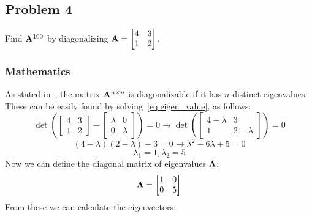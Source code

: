 \subsection{Problem 4}%
\label{sec:problem_4}
Find $\mathbf{A}^{100}$ by diagonalizing $\mathbf{A} = 
\begin{bmatrix}
    4 & 3\\
    1 & 2
\end{bmatrix}$.
\subsubsection*{Mathematics}
As stated in~\cite{Zdunek}, the matrix $\mathbf{A}^{n\times{}n}$ is diagonalizable if it
has $n$ distinct eigenvalues.
These can be easily found by solving~\eqref{eq:eigen_value}, as follows:
\begin{equation*}
    \det{\left(\begin{bmatrix}
        4 & 3 \\
        1 & 2 
    \end{bmatrix} - 
    \begin{bmatrix}
        \lambda & 0 \\
        0 & \lambda
    \end{bmatrix}\right)} = 0 \rightarrow
    \det{\left(\begin{bmatrix}
        4 - \lambda & 3 \\
        1 & 2 - \lambda
    \end{bmatrix}\right)} = 0
\end{equation*}
\begin{equation*}
    (4 - \lambda)(2 - \lambda) - 3 = 0 \rightarrow
    \lambda^2 - 6\lambda + 5 = 0
\end{equation*}
\begin{equation*}
    \lambda_1 = 1, \lambda_2 = 5 
\end{equation*}
Now we can define the diagonal matrix of eigenvalues $\mathbf{\Lambda}$:
\begin{equation*}
    \mathbf{\Lambda} = 
    \begin{bmatrix}
        1 & 0 \\
        0 & 5
    \end{bmatrix} 
\end{equation*} 
From these we can calculate the eigenvectors:
